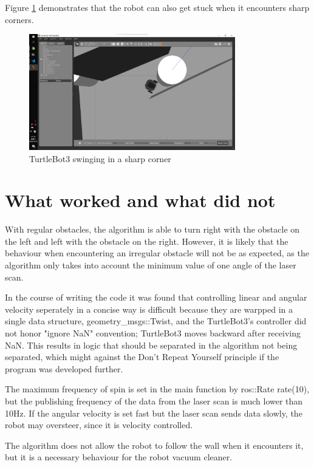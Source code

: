 Figure \ref{fig:test_corner} demonstrates that the robot can also get stuck when it encounters sharp corners.

\begin{figure}[htbp]
   \centering
   \includegraphics[width=0.8\textwidth]{figures/test_corner.png}
   \caption{TurtleBot3 swinging in a sharp corner}
   \label{fig:test_corner}
\end{figure} 

\section{What worked and what did not}

With regular obstacles, the algorithm is able to turn right with the obstacle on the left and left with the obstacle on the right. However, it is likely that the behaviour when encountering an irregular obstacle will not be as expected, as the algorithm only takes into account the minimum value of one angle of the laser scan.

In the course of writing the code it was found that controlling linear and angular velocity seperately in a concise way is difficult because they are warpped in a single data structure, geometry\_msgs::Twist, and the TurtleBot3's controller did not honor "ignore NaN" convention; TurtleBot3 moves backward after receiving NaN. This results in logic that should be separated in the algorithm not being separated, which might against the Don't Repeat Yourself principle if the program was developed further.

The maximum frequency of spin is set in the main function by ros::Rate rate(10), but the publishing frequency of the data from the laser scan is much lower than 10Hz. If the angular velocity is set fast but the laser scan sends data slowly, the robot may oversteer, since it is velocity controlled.

The algorithm does not allow the robot to follow the wall when it encounters it, but it is a necessary behaviour for the robot vacuum cleaner.
